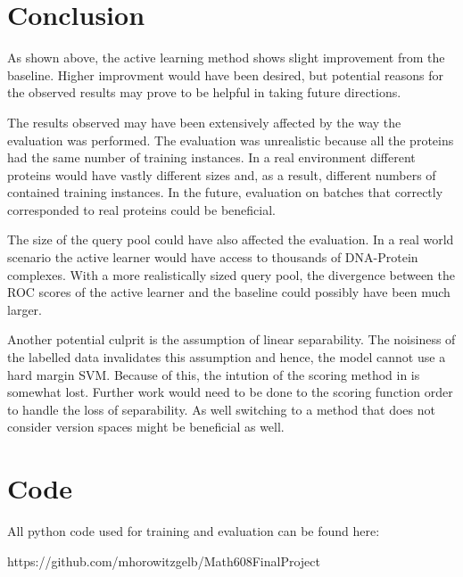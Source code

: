 \documentclass{article}
\begin{document}
\section*{Conclusion}
As shown above, the active learning method shows slight improvement from the baseline. Higher improvment would have been desired, but potential reasons for the observed results may prove to be helpful in taking future directions.

The results observed may have been extensively affected by the way the evaluation was performed. The evaluation was unrealistic because all the proteins had the same number of training instances. In a real environment different proteins would have vastly different sizes and, as a result, different numbers of contained training instances. In the future, evaluation on batches that correctly corresponded to real proteins could be beneficial. 

The size of the query pool could have also affected the evaluation. In a real world scenario the active learner would have access to thousands of DNA-Protein complexes. With a more realistically sized query pool, the divergence between the ROC scores of the active learner and the baseline could possibly have been much larger. 

Another potential culprit is the assumption of linear separability. The noisiness of the labelled data invalidates this assumption and hence, the model cannot use a hard margin SVM. Because of this, the intution of the scoring method in \cite{active_learning} is somewhat lost. Further work would need to be done to the scoring function order to handle the loss of separability. As well switching to a method that does not consider version spaces might be beneficial as well.

\section*{Code}
All python code used for training and evaluation can be found here:

https://github.com/mhorowitzgelb/Math608FinalProject 


{}
\end{document}
